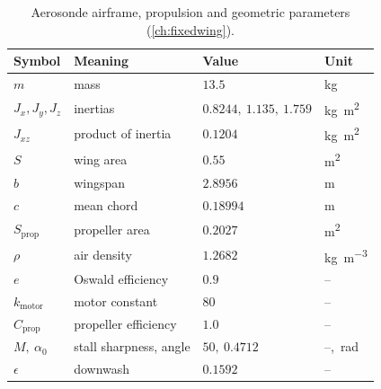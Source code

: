 \begin{table}[h]
\centering
\caption{Aerosonde airframe, propulsion and geometric parameters
(\cref{ch:fixedwing}).}
\label{tab:fw-params}
\begin{tabular}{@{}llll@{}}
\toprule
Symbol & Meaning & Value & Unit\\
\midrule
$m$ & mass & $13.5$ & \si{\kilogram}\\
$J_x,J_y,J_z$ & inertias & $0.8244,\ 1.135,\ 1.759$ & \si{\kilogram\meter\squared}\\
$J_{xz}$ & product of inertia & $0.1204$ & \si{\kilogram\meter\squared}\\
$S$ & wing area & $0.55$ & \si{\meter\squared}\\
$b$ & wingspan & $2.8956$ & \si{\meter}\\
$c$ & mean chord & $0.18994$ & \si{\meter}\\
$S_{\mathrm{prop}}$ & propeller area & $0.2027$ & \si{\meter\squared}\\
$\rho$ & air density & $1.2682$ & \si{\kilogram\per\meter\cubed}\\
$e$ & Oswald efficiency & $0.9$ & --\\
$k_{\mathrm{motor}}$ & motor constant & $80$ & --\\
$C_{\mathrm{prop}}$ & propeller efficiency & $1.0$ & --\\
$M,\ \alpha_0$ & stall sharpness, angle & $50,\ 0.4712$ & --,\ \si{\radian}\\
$\epsilon$ & downwash & $0.1592$ & --\\
\bottomrule
\end{tabular}
\end{table}

